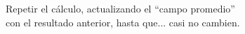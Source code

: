 \documentclass[preview]{standalone}
\begin{document}
\begin{center}
Repetir el cálculo, actualizando el ``campo promedio''\\con el resultado anterior, hasta que... casi no cambien.
\end{center}
\end{document}
